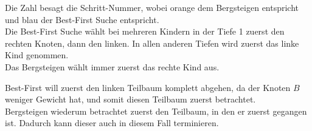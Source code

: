 \documentclass[german,colorful]{ExerciseLua}
\begin{document}
    \begin{exercise}{3}
        Die Zahl besagt die Schritt-Nummer, wobei {\color{orange}orange} dem {\color{orange}Bergsteigen} entspricht und {\color{blue}blau} der {\color{blue}Best-First Suche} entspricht.\\
        Die Best-First Suche wählt bei mehreren Kindern in der Tiefe 1 zuerst den rechten Knoten, dann den linken. In allen anderen Tiefen wird zuerst das linke Kind genommen.\\
        Das Bergsteigen wählt immer zuerst das rechte Kind aus.
        \begin{center}
        \end{center}
        Best-First will zuerst den linken Teilbaum komplett abgehen, da der Knoten $B$ weniger Gewicht hat, und somit diesen Teilbaum zuerst betrachtet. \\
        Bergsteigen wiederum betrachtet zuerst den Teilbaum, in den er zuerst gegangen ist. Dadurch kann dieser auch in diesem Fall terminieren.
    \end{exercise}
\end{document}

